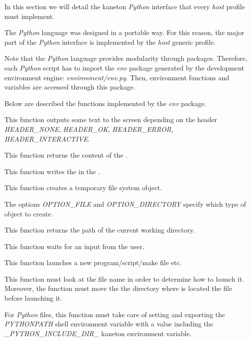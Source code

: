 

In this section we will detail the kaneton \textit{Python} interface that
every \textit{host} profile must implement.

The \textit{Python} language was designed in a portable way. For this
reason, the major part of the \textit{Python} interface is implemented
by the \textit{host} generic profile.

Note that the \textit{Python} language provides modularity through packages.
Therefore, each \textit{Python} script has to import the \textit{env} package
generated by the development environment engine: \textit{environment/env.py}.
Then, environment functions and variables are accessed through this package.

Below are described the functions implemented by the \textit{env} package.

         {
	   This function outputs some text to the screen depending on the
	   header \textit{HEADER\_NONE}, \textit{HEADER\_OK},
	   \textit{HEADER\_ERROR}, \textit{HEADER\_INTERACTIVE}.
	 }

         {
	   This function returns the content of the .
	 }

         {
	   This function writes the  in the .
	 }

         {
	   This function creates a temporary file system object.

	   \-

	   The options \textit{OPTION\_FILE} and \textit{OPTION\_DIRECTORY}
	   specify which type of object to create.
	 }

         {
	   This function returns the path of the current working directory.
	 }

         {
	   This function waits for an input from the user.
	 }

         {
	   This function launches a new program/script/make file etc.

	   \-

	   This function must look at the file name in order to determine
	   how to launch it. Moreover, the function must move the the
	   directory where is located the file before launching it.

	   \-

	   For \textit{Python} files, this function must take care of
	   setting and exporting the \textit{PYTHONPATH} shell environment
	   variable with a value including the
	   \textit{\_PYTHON\_INCLUDE\_DIR\_} kaneton environment variable.
	 }


